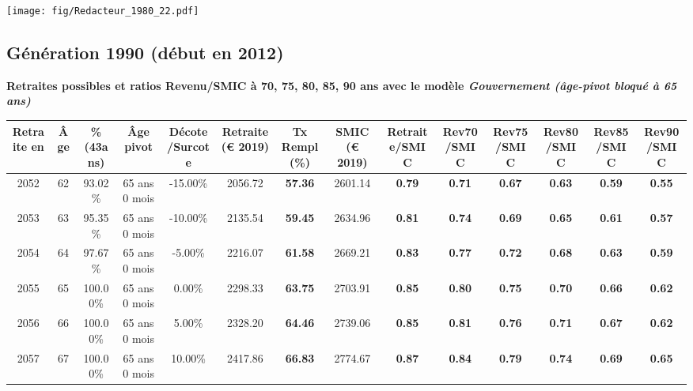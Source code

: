  \vspace{0.1cm} 

 \begin{center}\texttt{[image: fig/Redacteur\_1980\_22.pdf]}\end{center} \label{fig/Redacteur_1980_22.pdf} 

\newpage 
 
\subsection{Génération 1990 (début en 2012)} 

{\bf \noindent Retraites possibles et ratios Revenu/SMIC à 70, 75, 80, 85, 90 ans avec le modèle \emph{Gouvernement (âge-pivot bloqué à 65 ans)}}  
 
\begin{adjustbox}{max width=\textwidth} 
\begin{tabular}[htb]{|c|c||c|c|c||c|c||c||c|c|c|c|c|c|} 
\hline 
 Retraite en &  Âge &  \%(43ans) &  Âge pivot &  Décote/Surcote &  Retraite (\euro{} 2019) &  Tx Rempl(\%) &  SMIC (\euro{} 2019) &  Retraite/SMIC &  Rev70/SMIC &  Rev75/SMIC &  Rev80/SMIC &  Rev85/SMIC &  Rev90/SMIC \\ 
\hline \hline 
 2052 &  62 &  93.02\% &  65 ans 0 mois &  -15.00\% &  2056.72 &  {\bf 57.36} &  2601.14 &  {\bf {\color{red} 0.79}} &  {\bf {\color{red} 0.71}} &  {\bf {\color{red} 0.67}} &  {\bf {\color{red} 0.63}} &  {\bf {\color{red} 0.59}} &  {\bf {\color{red} 0.55}} \\ 
\hline 
 2053 &  63 &  95.35\% &  65 ans 0 mois &  -10.00\% &  2135.54 &  {\bf 59.45} &  2634.96 &  {\bf {\color{red} 0.81}} &  {\bf {\color{red} 0.74}} &  {\bf {\color{red} 0.69}} &  {\bf {\color{red} 0.65}} &  {\bf {\color{red} 0.61}} &  {\bf {\color{red} 0.57}} \\ 
\hline 
 2054 &  64 &  97.67\% &  65 ans 0 mois &  -5.00\% &  2216.07 &  {\bf 61.58} &  2669.21 &  {\bf {\color{red} 0.83}} &  {\bf {\color{red} 0.77}} &  {\bf {\color{red} 0.72}} &  {\bf {\color{red} 0.68}} &  {\bf {\color{red} 0.63}} &  {\bf {\color{red} 0.59}} \\ 
\hline 
 2055 &  65 &  100.00\% &  65 ans 0 mois &  0.00\% &  2298.33 &  {\bf 63.75} &  2703.91 &  {\bf {\color{red} 0.85}} &  {\bf {\color{red} 0.80}} &  {\bf {\color{red} 0.75}} &  {\bf {\color{red} 0.70}} &  {\bf {\color{red} 0.66}} &  {\bf {\color{red} 0.62}} \\ 
\hline 
 2056 &  66 &  100.00\% &  65 ans 0 mois &  5.00\% &  2328.20 &  {\bf 64.46} &  2739.06 &  {\bf {\color{red} 0.85}} &  {\bf {\color{red} 0.81}} &  {\bf {\color{red} 0.76}} &  {\bf {\color{red} 0.71}} &  {\bf {\color{red} 0.67}} &  {\bf {\color{red} 0.62}} \\ 
\hline 
 2057 &  67 &  100.00\% &  65 ans 0 mois &  10.00\% &  2417.86 &  {\bf 66.83} &  2774.67 &  {\bf {\color{red} 0.87}} &  {\bf {\color{red} 0.84}} &  {\bf {\color{red} 0.79}} &  {\bf {\color{red} 0.74}} &  {\bf {\color{red} 0.69}} &  {\bf {\color{red} 0.65}} \\ 
\hline 
\hline 
\end{tabular} 
\end{adjustbox} 
 
